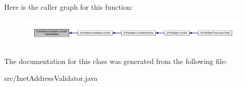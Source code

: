 Here is the caller graph for this function\+:
\nopagebreak
\begin{figure}[H]
\begin{center}
\leavevmode
\includegraphics[width=350pt]{classInetAddressValidator_a2bbbd69ca6baf133c01da93a5ad1b600_icgraph}
\end{center}
\end{figure}




The documentation for this class was generated from the following file\+:\begin{DoxyCompactItemize}
\item 
src/Inet\+Address\+Validator.\+java\end{DoxyCompactItemize}
